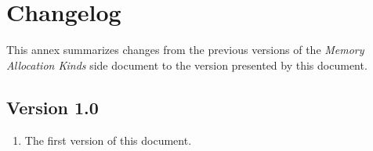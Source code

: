 \chapter{Changelog}

This annex summarizes changes from the previous versions of the \emph{Memory
Allocation Kinds} side document to the version presented by this
document.

\section{Version 1.0}

\begin{enumerate}
    \item The first version of this document.
\end{enumerate}
